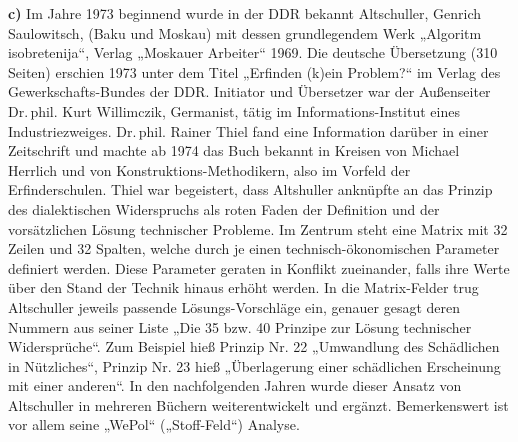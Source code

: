 \documentclass[12pt,a4paper]{article}
\begin{document}
\textbf{c)} 
Im Jahre 1973 beginnend wurde in der DDR bekannt Altschuller, Genrich
Saulowitsch, (Baku und Moskau) mit dessen grundlegendem Werk „Algoritm
isobretenija“, Verlag „Moskauer Arbeiter“ 1969. Die deutsche Übersetzung (310
Seiten) erschien 1973 unter dem Titel „Erfinden (k)ein Problem?“ im Verlag des
Gewerkschafts-Bundes der DDR. Initiator und Übersetzer war der Außenseiter
Dr.\,phil. Kurt Willimczik, Germanist, tätig im Informations-Institut eines
Industriezweiges. Dr.\,phil. Rainer Thiel fand eine Information darüber in
einer Zeitschrift und machte ab 1974 das Buch bekannt in Kreisen von Michael
Herrlich und von Konstruktions-Methodikern, also im Vorfeld der
Erfinderschulen. Thiel war begeistert, dass Altshuller anknüpfte an das Prinzip
des dialektischen Widerspruchs als roten Faden der Definition und der
vorsätzlichen Lösung technischer Probleme. Im Zentrum steht eine Matrix mit 32
Zeilen und 32 Spalten, welche durch je einen technisch-ökonomischen Parameter
definiert werden.  Diese Parameter geraten in Konflikt zueinander, falls ihre
Werte über den Stand der Technik hinaus erhöht werden. In die Matrix-Felder
trug Altschuller jeweils passende Lösungs-Vorschläge ein, genauer gesagt deren
Nummern aus seiner Liste „Die 35 bzw. 40 Prinzipe zur Lösung technischer
Widersprüche“.  Zum Beispiel hieß Prinzip Nr. 22 „Umwandlung des Schädlichen in
Nützliches“, Prinzip Nr. 23 hieß „Überlagerung einer schädlichen Erscheinung
mit einer anderen“. In den nachfolgenden Jahren wurde dieser Ansatz von
Altschuller in mehreren Büchern weiterentwickelt und ergänzt. Bemerkenswert ist
vor allem seine „WePol“ („Stoff-Feld“) Analyse.
\end{document}
